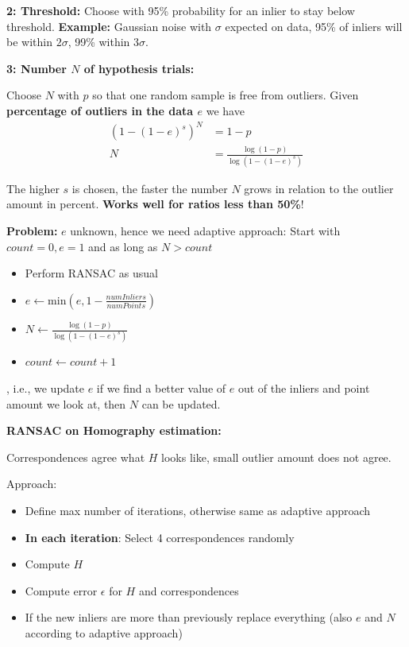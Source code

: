\textbf{2: Threshold:} Choose with 95\% probability for an inlier to stay below threshold. \textbf{Example:} Gaussian noise with $\sigma$ expected on data, 95\% of inliers will be within $2\sigma$, 99\% within $3\sigma$.

\textbf{3: Number $N$ of hypothesis trials:} 

Choose $N$ with $p$ so that one random sample is free from outliers. Given \textbf{percentage of outliers in the data $e$} we have \begin{align*}
    (1- (1-e)^s)^N & = 1 - p \\ N & = \frac{\log(1-p)}{\log(1-(1-e)^s)}
\end{align*}

The higher $s$ is chosen, the faster the number $N$ grows in relation to the outlier amount in percent. \textbf{Works well for ratios less than 50\%}!

\textbf{Problem:} $e$ unknown, hence we need adaptive approach: Start with $count = 0, e= 1$ and as long as $N > count$ \begin{itemize}
    \item Perform RANSAC as usual
    \item $e \leftarrow \mathrm{min} (e , 1 - \frac{numInliers}{numPoints})$
    \item $N \leftarrow \frac{\log(1-p)}{\log(1-(1-e)^s)}$
    \item $count \leftarrow count + 1$
\end{itemize} , i.e., we update $e$ if we find a better value of $e$ out of the inliers and point amount we look at, then $N$ can be updated.

\textbf{RANSAC on Homography estimation:}

Correspondences agree what $H$ looks like, small outlier amount does not agree.

Approach: \begin{itemize}
    \item Define max number of iterations, otherwise same as adaptive approach
    \item \textbf{In each iteration}: Select 4 correspondences randomly
    \item Compute $H$
    \item Compute error $\epsilon$ for $H$ and correspondences
    \item If the new inliers are more than previously replace everything (also $e$ and $N$ according to adaptive approach)
\end{itemize}

